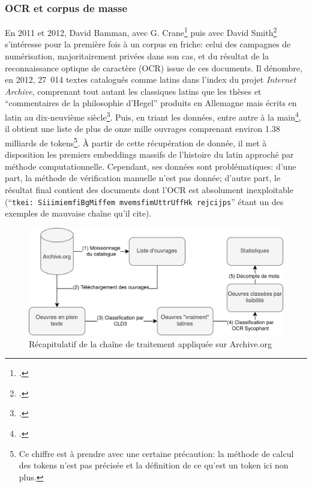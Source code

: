 \subsubsection{OCR et corpus de masse}

En 2011 et 2012, David Bamman, avec G. Crane\footcite{Bamman:2011:MHW:1998076.1998078} puis avec David Smith\footcite{bamman_extracting_2012} s'intéresse pour la première fois à un corpus en friche: celui des campagnes de numérisation, majoritairement privées dans son cas, et du résultat de la reconnaissance optique de caractère (OCR) issue de ces documents. Il dénombre, en 2012, 27~014 textes catalogués comme latins dans l'index du projet \textit{Internet Archive}, comprenant tout autant les classiques latins que les thèses et ``commentaires de la philosophie d'Hegel'' produits en Allemagne mais écrits en latin au dix-neuvième siècle\footcite{bamman_extracting_2012}. Puis, en triant les données, entre autre à la main\footcite{bamman_dbammanlatintexts_2018}, il obtient une liste de plus de onze mille ouvrages comprenant environ 1.38 milliards de tokens\footnote{Ce chiffre est à prendre avec une certaine précaution: la méthode de calcul des tokens n'est pas précisée et la définition de ce qu'est un token ici non plus.}. À partir de cette récupération de donnée, il met à disposition les premiers embeddings massifs de l'histoire du latin approché par méthode computationnelle. Cependant, ses données sont problématiques: d'une part, la méthode de vérification manuelle n'est pas donnée; d'autre part, le résultat final contient des documents dont l'OCR est absolument inexploitable (``\texttt{tkei: SiiimiemfiBgMiffem mvemsfimUttrUffHk rejcijps}'' étant un des exemples de mauvaise chaîne qu'il cite).

\begin{figure}
    \centering
    \includegraphics[width=.8\linewidth]{figures/ocrSycophant.png}
    \caption{Récapitulatif de la chaîne de traitement appliquée sur Archive.org}
    \label{fig:chap1:workflow-sycophant}
\end{figure}


